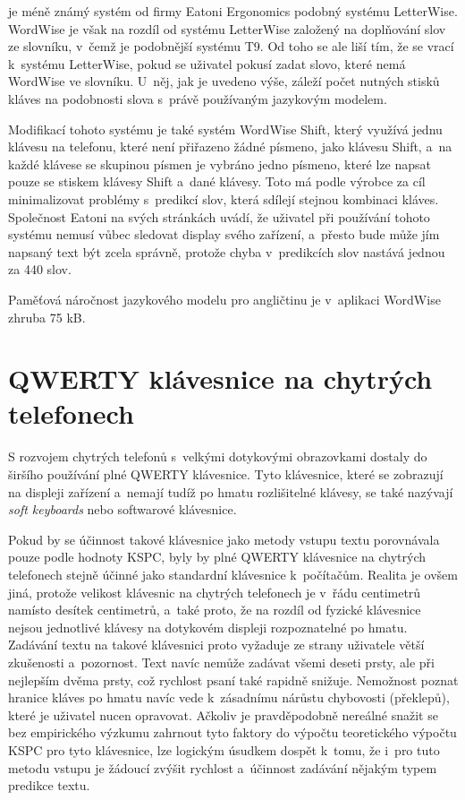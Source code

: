 \documentclass[a4paper,11pt,openany]{book} %
\begin{document}
je méně známý systém od firmy Eatoni Ergonomics podobný systému LetterWise. WordWise je však na rozdíl od systému LetterWise založený na doplňování slov ze slovníku, v~čemž je podobnější systému T9. Od toho se ale liší tím, že se vrací k~systému LetterWise, pokud se uživatel pokusí zadat slovo, které nemá WordWise ve slovníku. U~něj, jak je uvedeno výše, záleží počet nutných stisků kláves na podobnosti slova s~právě používaným jazykovým modelem. \parencite{eatoniwordwise}

Modifikací tohoto systému je také systém WordWise Shift, který využívá jednu klávesu na telefonu, které není přiřazeno žádné písmeno, jako klávesu Shift, a~na každé klávese se skupinou písmen je vybráno jedno písmeno, které lze napsat pouze se stiskem klávesy Shift a~dané klávesy. Toto má podle výrobce za cíl minimalizovat problémy s~predikcí slov, která sdílejí stejnou kombinaci kláves. Společnost Eatoni na svých stránkách uvádí, že uživatel při používání tohoto systému nemusí vůbec sledovat display svého zařízení, a~přesto bude může jím napsaný text být zcela správně, protože chyba v~predikcích slov nastává jednou za 440 slov. \parencite{eatoniwordwise}

Paměťová náročnost jazykového modelu pro angličtinu je v~aplikaci WordWise zhruba 75 kB. \parencite{eatoniwordwise} %

\section{QWERTY klávesnice na chytrých telefonech}

S rozvojem chytrých telefonů s~velkými dotykovými obrazovkami dostaly do širšího používání plné QWERTY klávesnice. Tyto klávesnice, které se zobrazují na displeji zařízení a~nemají tudíž po hmatu rozlišitelné klávesy, se také nazývají {\it soft keyboards} nebo softwarové klávesnice.

Pokud by se účinnost takové klávesnice jako metody vstupu textu porovnávala pouze podle hodnoty KSPC, byly by plné QWERTY klávesnice na chytrých telefonech stejně účinné jako standardní klávesnice k~počítačům. Realita je ovšem jiná, protože velikost klávesnic na chytrých telefonech je v~řádu centimetrů namísto desítek centimetrů, a~také proto, že na rozdíl od fyzické klávesnice nejsou jednotlivé klávesy na dotykovém displeji rozpoznatelné po hmatu. Zadávání textu na takové klávesnici proto vyžaduje ze strany uživatele větší zkušenosti a~pozornost. Text navíc nemůže zadávat všemi deseti prsty, ale při nejlepším dvěma prsty, což rychlost psaní také rapidně snižuje. Nemožnost poznat hranice kláves po hmatu navíc vede k~zásadnímu nárůstu chybovosti (překlepů), které je uživatel nucen opravovat. Ačkoliv je pravděpodobně nereálné snažit se bez empirického výzkumu zahrnout tyto faktory do výpočtu teoretického výpočtu KSPC pro tyto klávesnice, lze logickým úsudkem dospět k~tomu, že i~pro tuto metodu vstupu je žádoucí zvýšit rychlost a~účinnost zadávání nějakým typem predikce textu.
\end{document}
